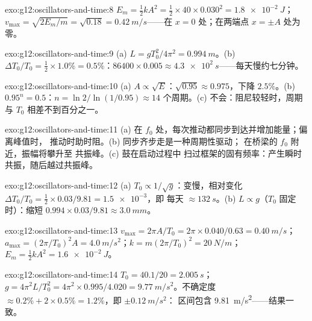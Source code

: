 \begin{solution}{exo:g12:oscillators-and-time:8}
$E_m = \tfrac12 kA^2 = \tfrac12 \times 40 \times 0.030^2 =
\qty{1.8e-2}{J}$；$v_{\max} = \sqrt{2E_m/m} = \sqrt{0.18} =
\qty{0.42}{m/s}$——在 $x = 0$ 处；在两端点 $x = \pm A$ 处为零。
\end{solution}

\begin{solution}{exo:g12:oscillators-and-time:9}
(a) $L = gT_0^2/4\pi^2 = \qty{0.994}{m}$。(b) $\Delta T_0/T_0 =
\tfrac12 \times 1.0\% = 0.5\%$：$86400 \times 0.005 \approx
\qty{4.3e2}{s}$——每天慢约七分钟。
\end{solution}

\begin{solution}{exo:g12:oscillators-and-time:10}
(a) $A \propto \sqrt{E}$：$\sqrt{0.95} \approx 0.975$，下降
$2.5\%$。(b) $0.95^n = 0.5$：$n = \ln 2/\ln(1/0.95) \approx 14$
个周期。(c) 不会：阻尼较轻时，周期与
$T_0$ 相差不到百分之一。
\end{solution}

\begin{solution}{exo:g12:oscillators-and-time:11}
(a) 在 $f_0$ 处，每次推动都同步到达并增加能量；偏离峰值时，
推动时助时阻。(b) 同步齐步走是一种周期性驱动；
在桥梁的 $f_0$ 附近，振幅将攀升至
共振峰。(c) 鼓在启动过程中
扫过框架的固有频率：产生瞬时共振，随后越过共振峰。
\end{solution}

\begin{solution}{exo:g12:oscillators-and-time:12}
(a) $T_0 \propto 1/\sqrt{g}$：变慢，相对变化 $\Delta T_0/T_0 = \tfrac12
\times 0.03/9.81 = \num{1.5e-3}$，即
每天 $\approx \qty{132}{s}$。(b) $L \propto g$（$T_0$ 固定时）：缩短 $0.994 \times
0.03/9.81 \approx \qty{3.0}{mm}$。
\end{solution}

\begin{solution}{exo:g12:oscillators-and-time:13}
$v_{\max} = 2\pi A/T_0 = 2\pi \times 0.040/0.63 = \qty{0.40}{m/s}$；
$a_{\max} = (2\pi/T_0)^2 A = \qty{4.0}{m/s^2}$；$k = m(2\pi/T_0)^2
= \qty{20}{N/m}$；$E_m = \tfrac12 kA^2 = \qty{1.6e-2}{J}$。
\end{solution}

\begin{solution}{exo:g12:oscillators-and-time:14}
$T_0 = 40.1/20 = \qty{2.005}{s}$；$g = 4\pi^2 L/T_0^2 = 4\pi^2
\times 0.995/4.020 = \qty{9.77}{m/s^2}$。不确定度 $\approx 0.2\%
+ 2 \times 0.5\% = 1.2\%$，即 $\pm\qty{0.12}{m/s^2}$：
区间包含 \qty{9.81}{m/s^2}——结果一致。
\end{solution}

